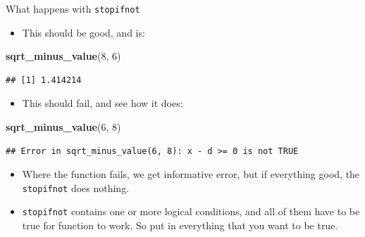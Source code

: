 \documentclass[ignorenonframetext,]{beamer}
\newenvironment{Shaded}{\begin{snugshade}}{\end{snugshade}}
\newcommand{\DecValTok}[1]{\textcolor[rgb]{0.00,0.00,0.81}{#1}}
\newcommand{\KeywordTok}[1]{\textcolor[rgb]{0.13,0.29,0.53}{\textbf{#1}}}
\newcommand{\NormalTok}[1]{#1}
\providecommand{\tightlist}{%
  \setlength{\itemsep}{0pt}\setlength{\parskip}{0pt}}
\begin{document}
\begin{frame}[fragile]{What happens with \texttt{stopifnot}}
\protect\hypertarget{what-happens-with-stopifnot}{}

\begin{itemize}
\tightlist
\item
  This should be good, and is:
\end{itemize}

\begin{Shaded}
\begin{Highlighting}[]
\KeywordTok{sqrt_minus_value}\NormalTok{(}\DecValTok{8}\NormalTok{, }\DecValTok{6}\NormalTok{)}
\end{Highlighting}
\end{Shaded}

\begin{verbatim}
## [1] 1.414214
\end{verbatim}

\begin{itemize}
\tightlist
\item
  This should fail, and see how it does:
\end{itemize}

\begin{Shaded}
\begin{Highlighting}[]
\KeywordTok{sqrt_minus_value}\NormalTok{(}\DecValTok{6}\NormalTok{, }\DecValTok{8}\NormalTok{)}
\end{Highlighting}
\end{Shaded}

\begin{verbatim}
## Error in sqrt_minus_value(6, 8): x - d >= 0 is not TRUE
\end{verbatim}

\begin{itemize}
\tightlist
\item
  Where the function fails, we get informative error, but if everything
  good, the \texttt{stopifnot} does nothing.
\item
  \texttt{stopifnot} contains one or more logical conditions, and all of
  them have to be true for function to work. So put in everything that
  you want to be true.
\end{itemize}

\end{frame}
\end{document}
